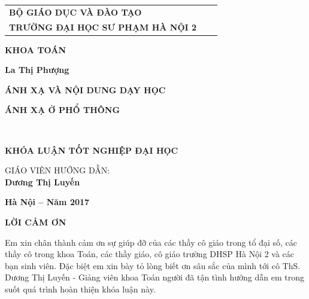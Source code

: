 \documentclass[12pt,oneside,a4paper,reqno]{book}
\begin{document}
\begin{titlepage}
\begin{longtable}{p{4cm}p{2cm}p{7cm}}
\centerline{\bf BỘ GIÁO DỤC VÀ ĐÀO TẠO}\\
\centerline{\bf TRƯỜNG ĐẠI HỌC SƯ PHẠM HÀ NỘI 2}\\

\end{longtable}
\vspace*{2 cm}
\centerline{\large\bf KHOA TOÁN}
\vspace*{2 cm}
\centerline{\large\bf La Thị Phượng}
\vspace*{2cm}
\centerline{\Large\bf ÁNH XẠ VÀ NỘI DUNG DẠY HỌC  }
\centerline{\Large\bf  ÁNH XẠ Ở PHỔ THÔNG}
\vspace*{1cm}
\begin{flushleft}
\hspace*{3.75cm}{\large\bf Chuyên ngành: Đại số}\\
\hspace*{3.75cm}{\large\bf Mã số: ???????}
\end{flushleft}
\vspace*{1cm}
\begin{center}
{\large\bf KHÓA LUẬN TỐT NGHIỆP ĐẠI HỌC}\\
\end{center}
\vspace*{1cm}
\begin{flushright}
GIÁO VIÊN HƯỚNG DẪN:\\
\textbf{Dương Thị Luyến}
\end{flushright}
\vfill
\centerline{\large\bf Hà Nội -- Năm 2017}
\vspace*{0.3cm}
\end{titlepage}

\large
\pagestyle{fancy}
\setcounter{page}{1}
\tableofcontents
\newpage
{}
\newpage
\vspace*{0.2cm}
\centerline{\Large\bf LỜI CẢM ƠN}
\medskip
Em xin chân thành cảm ơn sự giúp đỡ của các thầy cô giáo trong tổ đại số, các thầy cô trong khoa Toán, các thầy giáo, cô giáo trường DHSP Hà Nội 2 và các bạn sinh viên. Đặc biệt em xin bày tỏ lòng biết ơn sâu sắc của mình tới cô ThS. Dương Thị Luyến - Giảng viên khoa Toán người đã tận tình hướng dẫn em trong suốt quá trình hoàn thiện khóa luận này.
\end{document}
